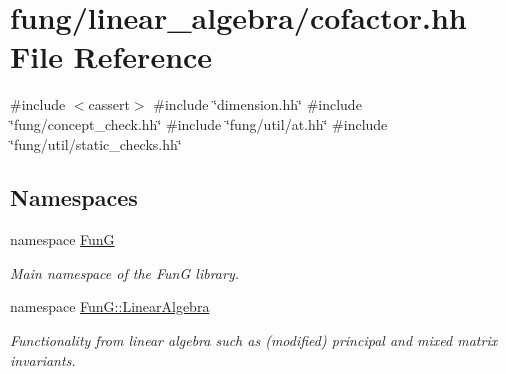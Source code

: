 \hypertarget{cofactor_8hh}{\section{fung/linear\-\_\-algebra/cofactor.hh \-File \-Reference}
\label{cofactor_8hh}
}
{\ttfamily \#include $<$cassert$>$}\*
{\ttfamily \#include \char`\"{}dimension.\-hh\char`\"{}}\*
{\ttfamily \#include \char`\"{}fung/concept\-\_\-check.\-hh\char`\"{}}\*
{\ttfamily \#include \char`\"{}fung/util/at.\-hh\char`\"{}}\*
{\ttfamily \#include \char`\"{}fung/util/static\-\_\-checks.\-hh\char`\"{}}\*
\subsection*{\-Namespaces}
\begin{DoxyCompactItemize}
\item 
namespace \hyperlink{namespaceFunG}{\-Fun\-G}
\begin{DoxyCompactList}\small\item\em \-Main namespace of the \-Fun\-G library. \end{DoxyCompactList}\item 
namespace \hyperlink{namespaceFunG_1_1LinearAlgebra}{\-Fun\-G\-::\-Linear\-Algebra}
\begin{DoxyCompactList}\small\item\em \-Functionality from linear algebra such as (modified) principal and mixed matrix invariants. \end{DoxyCompactList}\end{DoxyCompactItemize}
